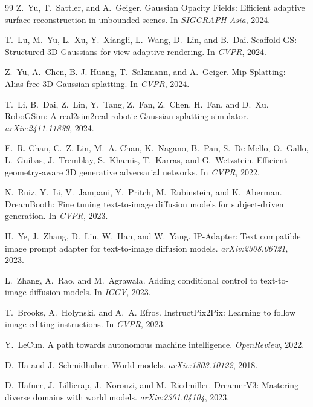 \begin{thebibliography}{99}
Z.~Yu, T.~Sattler, and A.~Geiger.
{Gaussian Opacity Fields}: Efficient adaptive surface reconstruction in unbounded scenes.
In \emph{SIGGRAPH Asia}, 2024.

T.~Lu, M.~Yu, L.~Xu, Y.~Xiangli, L.~Wang, D.~Lin, and B.~Dai.
Scaffold-{GS}: Structured 3{D} Gaussians for view-adaptive rendering.
In \emph{CVPR}, 2024.

Z.~Yu, A.~Chen, B.-J. Huang, T.~Salzmann, and A.~Geiger.
Mip-Splatting: Alias-free 3{D} Gaussian splatting.
In \emph{CVPR}, 2024.

T.~Li, B.~Dai, Z.~Lin, Y.~Tang, Z.~Fan, Z.~Chen, H.~Fan, and D.~Xu.
{RoboGSim}: A real2sim2real robotic Gaussian splatting simulator.
\emph{arXiv:2411.11839}, 2024.

E.~R. Chan, C.~Z. Lin, M.~A. Chan, K.~Nagano, B.~Pan, S.~De Mello, O.~Gallo, L.~Guibas, J.~Tremblay, S.~Khamis, T.~Karras, and G.~Wetzstein.
Efficient geometry-aware 3{D} generative adversarial networks.
In \emph{CVPR}, 2022.

N.~Ruiz, Y.~Li, V.~Jampani, Y.~Pritch, M.~Rubinstein, and K.~Aberman.
{DreamBooth}: Fine tuning text-to-image diffusion models for subject-driven generation.
In \emph{CVPR}, 2023.

H.~Ye, J.~Zhang, D.~Liu, W.~Han, and W.~Yang.
{IP-Adapter}: Text compatible image prompt adapter for text-to-image diffusion models.
\emph{arXiv:2308.06721}, 2023.

L.~Zhang, A.~Rao, and M.~Agrawala.
Adding conditional control to text-to-image diffusion models.
In \emph{ICCV}, 2023.

T.~Brooks, A.~Holynski, and A.~A. Efros.
{InstructPix2Pix}: Learning to follow image editing instructions.
In \emph{CVPR}, 2023.

Y.~LeCun.
A path towards autonomous machine intelligence.
\emph{OpenReview}, 2022.

D.~Ha and J.~Schmidhuber.
World models.
\emph{arXiv:1803.10122}, 2018.

D.~Hafner, J.~Lillicrap, J.~Norouzi, and M.~Riedmiller.
{DreamerV3}: Mastering diverse domains with world models.
\emph{arXiv:2301.04104}, 2023.


\end{thebibliography}

